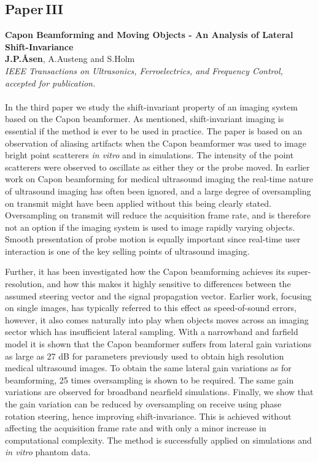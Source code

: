 \subsection{Paper\,III}
\textbf{Capon Beamforming and Moving Objects - An Analysis of Lateral Shift-Invariance}\\
\textbf{J.\:P.\:\AA{}sen}, A.\:Austeng and S.\:Holm\\
{\it IEEE Transactions on Ultrasonics, Ferroelectrics, and Frequency Control, accepted for publication.}\\\\
In the third paper we study the shift-invariant property of an imaging system based on the Capon beamformer. As mentioned, shift-invariant imaging is essential if the method is ever to be used in practice. The paper is based on an observation of aliasing artifacts when the Capon beamformer was used to image bright point scatterers \textit{in vitro} and in simulations. The intensity of the point scatterers were observed to oscillate as either they or the probe moved. In earlier work on Capon beamforming for medical ultrasound imaging the real-time nature of ultrasound imaging has often been ignored, and a large degree of oversampling on transmit might have been applied without this being clearly stated. Oversampling on transmit will reduce the acquisition frame rate, and is therefore not an option if the imaging system is used to image rapidly varying objects. Smooth presentation of probe motion is equally important since real-time user interaction is one of the key selling points of ultrasound imaging.

Further, it has been investigated how the Capon beamforming achieves its super-resolution, and how this makes it highly sensitive to differences between the assumed steering vector and the signal propagation vector. Earlier work, focusing on single images, has typically referred to this effect as speed-of-sound errors, however, it also comes naturally into play when objects moves across an imaging sector which has insufficient lateral sampling. With a narrowband and farfield model it is shown that the Capon beamformer suffers from lateral gain variations as large as 27 dB for parameters previously used to obtain high resolution medical ultrasound images.  To obtain the same lateral gain variations as for  beamforming, 25 times oversampling is shown to be required. The same gain variations are observed for broadband nearfield simulations. Finally, we show that the gain variation can be reduced by oversampling on receive using phase rotation steering, hence improving shift-invariance. This is achieved without affecting the acquisition frame rate and with only a minor increase in computational complexity. The method is successfully applied on simulations and \textit{in vitro} phantom data.

